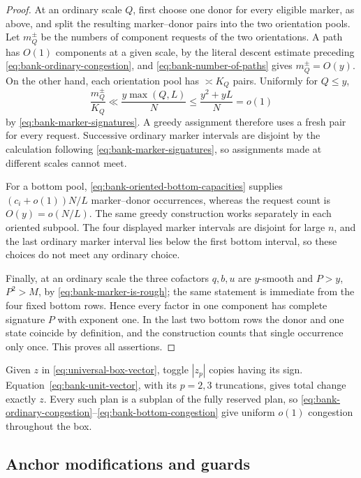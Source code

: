 \documentclass[11pt]{article}
\numberwithin{equation}{section}
\theoremstyle{definition}
\theoremstyle{remark}
\newcommand{\1}{\mathbf 1}
\begin{document}
\begin{proof}
At an ordinary scale \(Q\), first choose one donor for every eligible
marker, as above, and split the resulting marker--donor pairs into the two
orientation pools.  Let \(m_Q^\pm\) be the numbers of component requests
of the two orientations.  A path has \(O(1)\) components at a given
scale, by the literal descent estimate preceding
\eqref{eq:bank-ordinary-congestion}, and
\eqref{eq:bank-number-of-paths} gives
\(m_Q^\pm=O(y)\).  On the other hand, each orientation pool has
\(\asymp K_Q\) pairs.  Uniformly for \(Q\le y\),
\[
 \frac{m_Q^\pm}{K_Q}
 \ll \frac{y\max(Q,L)}N
 \le \frac{y^2+yL}{N}=o(1)
\]
by \eqref{eq:bank-marker-signatures}.  A greedy assignment therefore
uses a fresh pair for every request.  Successive ordinary marker intervals
are disjoint by the calculation following
\eqref{eq:bank-marker-signatures}, so assignments made at different
scales cannot meet.

For a bottom pool, \eqref{eq:bank-oriented-bottom-capacities} supplies
\((c_i+o(1))N/L\) marker--donor occurrences, whereas the request count is
\(O(y)=o(N/L)\).  The same greedy construction works separately in each
oriented subpool.  The four displayed marker intervals are disjoint for
large \(n\), and the last ordinary marker interval lies below the first
bottom interval, so these choices do not meet any ordinary choice.

Finally, at an ordinary scale the three cofactors \(q,b,u\) are
\(y\)-smooth and \(P>y\), \(P^2>M\), by
\eqref{eq:bank-marker-is-rough}; the same statement is immediate from the
four fixed bottom rows.  Hence every factor in one component has complete
signature \(P\) with exponent one.  In the last two bottom rows the donor
and one state coincide by definition, and the construction counts that
single occurrence only once.  This proves all assertions.
\end{proof}

Given \(z\) in \eqref{eq:universal-box-vector}, toggle \(|z_p|\) copies
having its sign.  Equation~\eqref{eq:bank-unit-vector}, with its
\(p=2,3\) truncations, gives total change exactly \(z\).  Every such plan
is a subplan of the fully reserved plan, so
\eqref{eq:bank-ordinary-congestion}--\eqref{eq:bank-bottom-congestion}
give uniform \(o(1)\) congestion throughout the box.

\subsection{Anchor modifications and guards}
\label{subsec:bank-anchor-guards}
\end{document}
